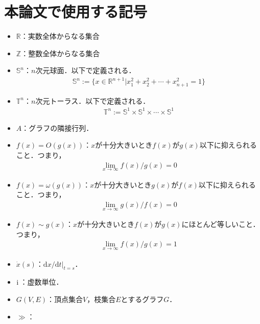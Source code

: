 \documentclass[../main]{subfiles}
\begin{document}
\chapter*{本論文で使用する記号}
\begin{itemize}
    \item
    $\mathbb{R}$：実数全体からなる集合
    \item
    $\mathbb{Z}$：整数全体からなる集合
    \item
    $\mathbb{S}^n$：$n$次元球面．以下で定義される．
    \begin{align*}
        \mathbb{S}^n:=\{x\in\mathbb{R}^{n+1}|x_1^2+x_2^2+\cdots+x_{n+1}^2=1\}
    \end{align*}    
    \item
    $\mathbb{T}^n$：$n$次元トーラス．以下で定義される．
    \begin{align*}
        \mathbb{T}^n:=\mathbb{S}^1\times\mathbb{S}^1\times \cdots\times \mathbb{S}^1
    \end{align*}
    \item 
    $A$：グラフの隣接行列．
    \item
    $f(x)=O(g(x))$：$x$が十分大きいとき$f(x)$が$g(x)$以下に抑えられること．つまり，
    \begin{align*}
        \lim_{x\to\infty}f(x)/g(x)=0
    \end{align*}
    \item
    $f(x)=\omega(g(x))$：$x$が十分大きいとき$g(x)$が$f(x)$以下に抑えられること．つまり，
    \begin{align*}
        \lim_{x\to\infty}g(x)/f(x)=0
    \end{align*}
    \item
    $f(x)\sim g(x)$：$x$が十分大きいとき$f(x)$が$g(x)$にほとんど等しいこと．つまり，
    \begin{align*}
        \lim_{x\to\infty}f(x)/g(x)=1
    \end{align*}    
    \item
    $\dot{x}(s)$：$\mathrm{d}x/\mathrm{d}t|_{t=s}$．
    \item
    ${\mathrm i\,}$：虚数単位．
    \item
    $G(V,E)$：頂点集合$V$，枝集合$E$とするグラフ$G$．
    \item
    $\gg$：
\end{itemize}
\end{document}

